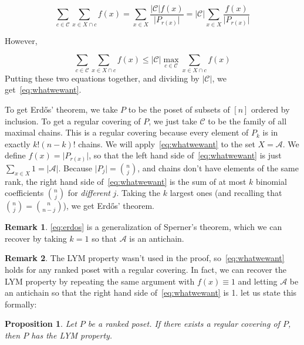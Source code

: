 \documentclass{amsart}
\theoremstyle{plain}
\newtheorem{proposition}[theorem]{\textbf{Proposition}}
\theoremstyle{definition}
\newtheorem{rk}{\textbf{Remark}}
\begin{document}
    \begin{equation}\label{eq:intermediate_1}
    \sum_{c \in \mathcal{C}} \sum_{x \in X \cap c} f(x) =
    \sum_{x \in X} \frac{\lvert \mathcal{C} \rvert f(x)}{\lvert P_{r(x)} \rvert}
    = \lvert \mathcal{C} \rvert \sum_{x \in X} \frac{f(x)}{\lvert P_{r(x)} \rvert}
    \end{equation}

    However,

    \begin{equation}\label{eq:intermediate_2}
    \sum_{c \in \mathcal{C}} \sum_{x \in X \cap c} f(x) \leq \lvert \mathcal{C} \rvert \max_{c \in \mathcal{C}} \sum_{x \in X \cap c} f(x)
    \end{equation}
    Putting these two equations together, and dividing by $\lvert \mathcal{C} \rvert$, we get~\eqref{eq:whatwewant}.

    \noindent To get Erd\H{o}s' theorem, we take $P$ to be the poset of subsets of $[n]$ ordered by inclusion.
    To get a regular covering of $P$, we just take $\mathcal{C}$ to be the family of all maximal chains.
    This is a regular covering because every element of $P_k$ is in exactly $k!(n-k)!$ chains.
    We will apply~\eqref{eq:whatwewant} to the set $X = \mathcal{A}$.
    We define $f(x) = \lvert P_{r(x)} \rvert$, so that the left hand side of~\eqref{eq:whatwewant} is just
    $\sum_{x \in X} 1 = \lvert \mathcal{A} \rvert$.
    Because $\lvert P_j \rvert = \binom{n}{j}$,
    and chains don't have elements of the same rank, the right hand side of~\eqref{eq:whatwewant} is
    the sum of at most $k$ binomial coefficients $\binom{n}{j}$ for \emph{different} $j$.
    Taking the $k$ largest ones (and recalling that $\binom{n}{j} = \binom{n}{n-j}$), we get Erd\H{o}s' theorem.

    \begin{rk}
        \eqref{eq:erdos} is a generalization of Sperner's theorem,
        which we can recover by taking $k=1$ so that $\mathcal{A}$ is an antichain.
    \end{rk}

    \begin{rk}
    The LYM property wasn't used in the proof, so~\eqref{eq:whatwewant}
    holds for any ranked poset with a regular covering.
    In fact, we can recover the LYM property by repeating the same argument with $f(x) \equiv 1 $
    and letting $\mathcal{A}$ be an antichain so that the right hand side of~\eqref{eq:whatwewant} is 1.
    let us state this formally:

    \begin{proposition}
        Let $P$ be a ranked poset.
        If there exists a regular covering of $P$, then $P$ has the LYM property.
    \end{proposition}

    \end{rk}
\end{document}
